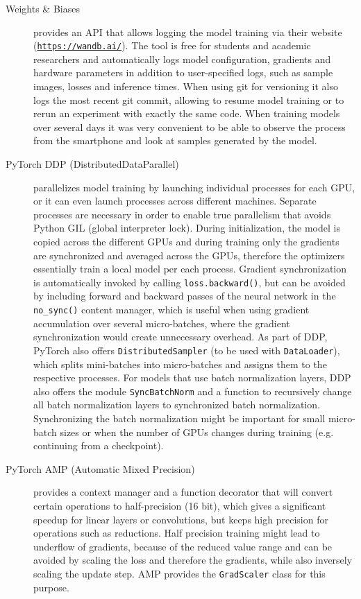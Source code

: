\begin{description}
    \item[Weights \& Biases] provides an API that allows logging the model training via their website (\hyperlink{https://wandb.ai/}{\texttt{https://\-wandb.ai/}}). The tool is free for students and academic researchers and automatically logs model configuration, gradients and hardware parameters in addition to user-specified logs, such as sample images, losses and inference times. When using git for versioning it also logs the most recent git commit, allowing to resume model training or to rerun an experiment with exactly the same code. When training models over several days it was very convenient to be able to observe the process from the smartphone and look at samples generated by the model.~\autocite{wandb}
    \item[PyTorch DDP (Distributed\-Data\-Parallel)] parallelizes model training by launching individual processes for each GPU, or it can even launch processes across different machines. Separate processes are necessary in order to enable true parallelism that avoids Python GIL (global interpreter lock). During initialization, the model is copied across the different GPUs and during training only the gradients are synchronized and averaged across the GPUs, therefore the optimizers essentially train a local model per each process. Gradient synchronization is automatically invoked by calling \texttt{loss.backward()}, but can be avoided by including forward and backward passes of the neural network in the \texttt{no\_sync()} content manager, which is useful when using gradient accumulation over several micro-batches, where the gradient synchronization would create unnecessary overhead. As part of DDP, PyTorch also offers \texttt{Distributed\-Sampler} (to be used with \texttt{Data\-Loader}), which splits mini-batches into micro-batches and assigns them to the respective processes. For models that use batch normalization layers, DDP also offers the module \texttt{SyncBatchNorm} and a function to recursively change all batch normalization layers to synchronized batch normalization. Synchronizing the batch normalization might be important for small micro-batch sizes or when the number of GPUs changes during training (e.g. continuing from a checkpoint).
    \item[PyTorch AMP (Automatic Mixed Precision)] provides a context manager and a function decorator that will convert certain operations to half-precision (16 bit), which gives a significant speedup for linear layers or convolutions, but keeps high precision for operations such as reductions. Half precision training might lead to underflow of gradients, because of the reduced value range and can be avoided by scaling the loss and therefore the gradients, while also inversely scaling the update step. AMP provides the \texttt{GradScaler} class for this purpose.
\end{description}